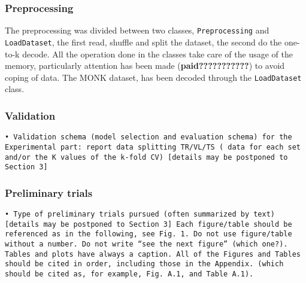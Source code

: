 \subsubsection{Preprocessing}
The preprocessing was divided between two classes, \texttt{Preprocessing} and \texttt{LoadDataset}, the first read, shuffle and split the dataset, the second do the one-to-k decode. All the operation done in the classes take care of the usage of the memory, particularly attention has been made (\textbf{paid???????????}) to avoid coping of data. The MONK dataset, has been decoded through the \texttt{LoadDataset} class.

\subsubsection{Validation}
\texttt{• Validation schema (model selection and evaluation schema) for the Experimental part: report data splitting  TR/VL/TS ( data for each set and/or the K values of the k-fold CV) [details may be postponed to Section 3]}

\subsubsection{Preliminary trials}
\texttt{• Type of preliminary trials pursued (often summarized by text) [details may be postponed to Section 3]
Each figure/table should be referenced as in the following, see Fig. 1. 
Do not use figure/table without a number. Do not write “see the next figure” (which one?).
Tables and plots have always a caption. All of the Figures and Tables should be cited in order, including those in the Appendix. (which should be cited as, for example, Fig. A.1, and Table A.1).}
